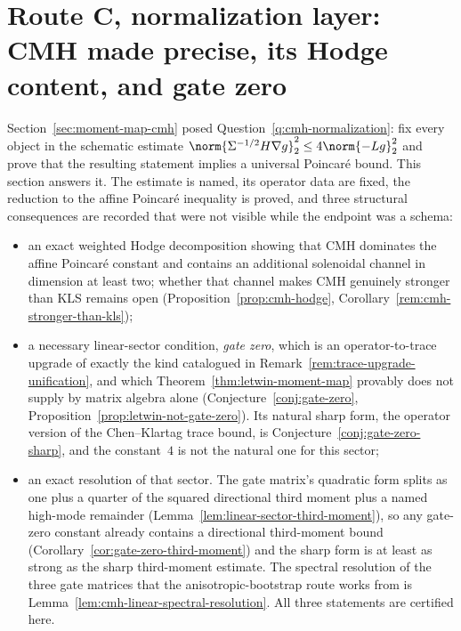 \documentclass[../../main.tex]{subfiles}
\begin{document}
\section{Route C, normalization layer: CMH made precise, its Hodge content, and gate zero}
\label{sec:cmh-normalization}

Section~\ref{sec:moment-map-cmh} posed Question~\ref{q:cmh-normalization}: fix every object in
the schematic estimate $\norm{\Sigma^{-1/2}H\nabla g}_2^2\le4\norm{-Lg}_2^2$ and prove that the
resulting statement implies a universal Poincar\'e bound. This section answers it. The estimate
is named, its operator data are fixed, the reduction to the affine Poincar\'e inequality is
proved, and three structural consequences are recorded that were not visible while the endpoint
was a schema:

\begin{itemize}[leftmargin=1.4em]
  \item an exact weighted Hodge decomposition showing that CMH dominates the affine
        Poincar\'e constant and contains an additional solenoidal channel in dimension at least
        two; whether that channel makes CMH genuinely stronger than KLS remains open
        (Proposition~\ref{prop:cmh-hodge}, Corollary~\ref{rem:cmh-stronger-than-kls});
  \item a necessary linear-sector condition, \emph{gate zero}, which is an operator-to-trace
        upgrade of exactly the kind catalogued in Remark~\ref{rem:trace-upgrade-unification},
        and which Theorem~\ref{thm:letwin-moment-map} provably does not supply by matrix algebra
        alone (Conjecture~\ref{conj:gate-zero}, Proposition~\ref{prop:letwin-not-gate-zero}).
        Its natural sharp form, the operator version of the Chen--Klartag trace bound, is
        Conjecture~\ref{conj:gate-zero-sharp}, and the constant~$4$ is not the natural one for
        this sector;
  \item an exact resolution of that sector. The gate matrix's quadratic form splits as one plus
        a quarter of the squared directional third moment plus a named high-mode remainder
        (Lemma~\ref{lem:linear-sector-third-moment}), so any gate-zero constant already contains
        a directional third-moment bound (Corollary~\ref{cor:gate-zero-third-moment}) and the
        sharp form is at least as strong as the sharp third-moment estimate. The spectral
        resolution of the three gate matrices that the anisotropic-bootstrap route works from
        is Lemma~\ref{lem:cmh-linear-spectral-resolution}. All three statements are certified
        here.
\end{itemize}
\end{document}
